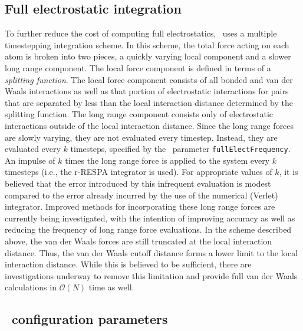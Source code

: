 \subsection{Full electrostatic integration}
\label{section:fmadesc}

To further reduce the cost of computing full electrostatics, 
\NAMD\ uses a multiple timestepping integration scheme.  In this scheme, 
the total force acting on each atom is broken into two pieces, a quickly varying local 
component and a slower long range component.  
The local force component is defined in terms of a {\it splitting function}.  The local force component consists of all bonded and van der Waals interactions
as well as that portion of electrostatic interactions for pairs that are separated by less than the local interaction distance determined by the splitting function.  
The long range component consists only of 
electrostatic interactions outside of the local interaction distance.
Since the long range forces are slowly varying, they are not evaluated
every timestep.  Instead, they are evaluated every $k$ timesteps,
specified by the \NAMD\ parameter {\tt fullElectFrequency}.  
An impulse of $k$ times the long range force is applied to the system
every $k$ timesteps (i.e., the r-RESPA integrator is used).
For appropriate values of $k$,
it is believed that the error introduced by this infrequent evaluation
is modest compared to the error already incurred by the use of the numerical
(Verlet) integrator.  
Improved methods for incorporating these long range forces
are currently being investigated, 
with the intention of improving accuracy as well as 
reducing the frequency of long range force evaluations.  
\prettypar
In the scheme described above, the van der Waals forces are still 
truncated at the local interaction distance.  
Thus, the van der Waals cutoff distance 
forms a lower limit to the local interaction distance.  While this is
believed to be sufficient, there are investigations underway to remove
this limitation and provide full van der Waals calculations in 
${\mathcal O}(N)$ time as well.  


\subsection{\NAMD\ configuration parameters}
\label{section:config_basic}


